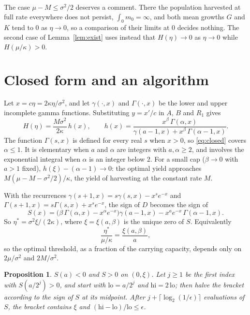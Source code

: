 \documentclass[11pt]{article}
\newtheorem{proposition}[theorem]{Proposition}
\theoremstyle{definition}
\begin{document}
The case $\mu - M \le \sigma^2/2$ deserves a comment. There the population harvested at full rate everywhere
does not persist, $\int_0 m_0 = \infty$, and both mean growths $G$ and $K$ tend to $0$ as $\eta \to 0$, so a
comparison of their limits at $0$ decides nothing. The second case of Lemma~\ref{lem:exist} uses instead that
$H(\eta) \to 0$ as $\eta \to 0$ while $H(\mu/\kappa) > 0$.

\section{Closed form and an algorithm}\label{sec:closed}

Let $x = c\eta = 2\kappa\eta/\sigma^2$, and let $\gamma(\cdot,x)$ and $\Gamma(\cdot,x)$ be the lower and upper
incomplete gamma functions. Substituting $y = x'/c$ in $A$, $B$ and $R_1$ gives
\begin{equation}\label{eq:closed}
  H(\eta) = \frac{M\sigma^2}{2\kappa}\,h(x), \qquad
  h(x) = \frac{x^\beta\,\Gamma(\alpha,x)}{\gamma(a-1,x) + x^\beta\,\Gamma(\alpha-1,x)} .
\end{equation}
The function $\Gamma(s,x)$ is defined for every real $s$ when $x > 0$, so \eqref{eq:closed} covers $\alpha \le 1$.
It is elementary when $a$ and $\alpha$ are integers with $a, \alpha \ge 2$, and involves the exponential
integral when $\alpha$ is an integer below $2$. For a small cap ($\beta \to 0$ with $a > 1$ fixed), $h(\xi) - (\alpha - 1) \to 0$: the optimal yield
approaches $M(\mu - M - \sigma^2/2)/\kappa$, the yield of harvesting at the constant rate $M$.

With the recurrences $\gamma(s+1,x) = s\gamma(s,x) - x^se^{-x}$ and $\Gamma(s+1,x) = s\Gamma(s,x) + x^se^{-x}$, the
sign of $D$ becomes the sign of
\begin{equation}\label{eq:S}
  S(x) = \bigl(\beta\,\Gamma(\alpha,x) - x^\alpha e^{-x}\bigr)\gamma(a-1,x) - x^a e^{-x}\,\Gamma(\alpha-1,x).
\end{equation}
So $\eta^* = \sigma^2\xi/(2\kappa)$, where $\xi = \xi(a,\beta)$ is the unique zero of $S$. Equivalently
\begin{equation}\label{eq:ratio}
  \frac{\eta^*}{\mu/\kappa} = \frac{\xi(a,\beta)}{a} ,
\end{equation}
so the optimal threshold, as a fraction of the carrying capacity, depends only on $2\mu/\sigma^2$ and
$2M/\sigma^2$.

\begin{proposition}\label{prop:bisection}
$S(a) < 0$ and $S > 0$ on $(0,\xi)$. Let $j \ge 1$ be the first index with $S(a/2^j) > 0$, and start with
$\mathrm{lo} = a/2^j$ and $\mathrm{hi} = 2\,\mathrm{lo}$; then halve the bracket according to the sign of $S$ at
its midpoint. After $j + \lceil\log_2(1/\epsilon)\rceil$ evaluations of $S$, the bracket contains $\xi$ and
$(\mathrm{hi} - \mathrm{lo})/\mathrm{lo} \le \epsilon$.
\end{proposition}
\end{document}
